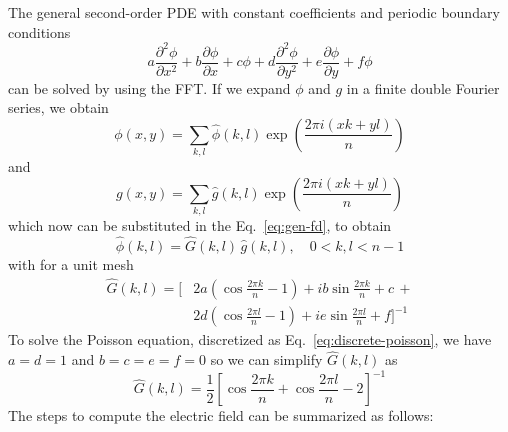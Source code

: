 The general second-order PDE with constant coefficients and periodic boundary 
conditions
%
\begin{equation}%
\label{eq:gen-fd}
a \frac{\partial^2 \phi}{\partial x^2}+b\frac{\partial \phi}{\partial x}+c\phi +
d \frac{\partial^2 \phi}{\partial y^2}+e\frac{\partial \phi}{\partial y}+f\phi
\end{equation}%
%
can be solved by using the FFT. If we expand $\phi$ and $g$ in a finite double 
Fourier series, we obtain
%
\begin{equation}%
\phi(x,y) = \sum_{k,l} \hat \phi(k, l) \exp\left({\frac{2\pi i (xk + 
yl)}{n}}\right)
\end{equation}%
%
and
%
\begin{equation}%
g(x,y) = \sum_{k,l} \hat g(k, l) \exp\left({\frac{2\pi i (xk + yl)}{n}}\right)
\end{equation}%
%
which now can be substituted in the Eq.~\ref{eq:gen-fd}, to obtain
%
\begin{equation}%
\hat \phi(k,l) = \hat G(k,l) \, \hat g(k,l),\quad 0<k,l<n-1
\end{equation}%
%
with for a unit mesh
%
\begin{equation}%
\begin{split}
\hat G(k,l) = \Bigg[
& 2a \left( \cos \frac{2\pi k}{n} - 1 \right) +
ib \sin \frac{2\pi k}{n} + c \,+ \\
& 2d \left( \cos \frac{2\pi l}{n} - 1 \right) +
ie \sin \frac{2\pi l}{n} + f
\Bigg]^{-1}
\end{split}
\end{equation}%
%
To solve the Poisson equation, discretized as Eq.~\ref{eq:discrete-poisson}, we 
have $a=d=1$ and $b=c=e=f=0$ so we can simplify $\hat G(k,l)$ as
%
\begin{equation}%
\hat G(k,l) = \frac{1}{2}\left[
\cos \frac{2\pi k}{n} +
\cos \frac{2\pi l}{n} -
2 \right]^{-1}
\end{equation}%
%
The steps to compute the electric field can be summarized as follows:
%
\begin{center}%
\end{center}%
